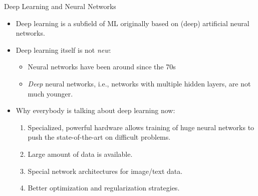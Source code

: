 \begin{frame} {Deep Learning and Neural Networks}
\begin{itemize}
\item Deep learning is a subfield of ML originally based on (deep) artificial neural networks.
\vspace{.3cm}
\item Deep learning itself is not \textit{new}:
\begin{itemize}
\item Neural networks have been around since the 70s
\item \textit{Deep} neural networks, i.e., networks with multiple hidden layers, are not much younger.
\end{itemize}
\vspace{.3cm}
\item Why everybody is talking about deep learning now:
\begin{enumerate}
\vspace{.1cm}
\item Specialized, powerful hardware allows training of huge neural networks to push the state-of-the-art on difficult problems.
\vspace{.2cm}
\item Large amount of data is available.
\vspace{.2cm}
\item Special network architectures for image/text data.
\vspace{.2cm}
\item Better optimization and regularization strategies.
\end{enumerate}
\end{itemize}
\end{frame}

